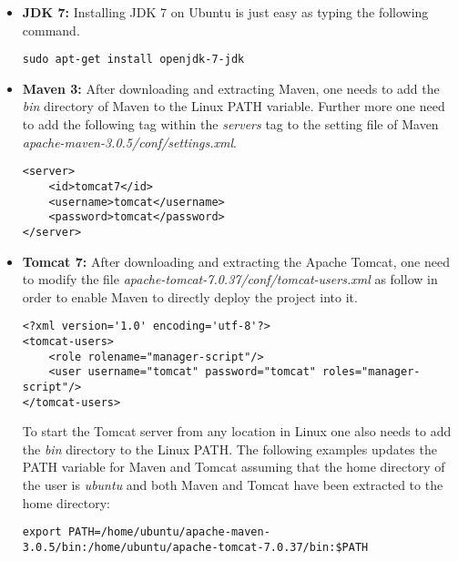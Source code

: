 \begin{itemize}
\item{\textbf{\ac{JDK} 7:}} Installing  \ac{JDK} 7 on Ubuntu is just easy as typing the following command.%
\begin{code}
\begin{verbatim}
sudo apt-get install openjdk-7-jdk
\end{verbatim}
\end{code}

\item{\textbf{Maven 3:}}  After downloading and extracting Maven, one needs to add the \textit{bin} directory of Maven to the Linux PATH variable. Further more one need to add the following tag within the \textit{servers} tag to the setting file of Maven \textit{apache-maven-3.0.5/conf/settings.xml}.
\begin{code}
\begin{verbatim}
<server>
	<id>tomcat7</id>
	<username>tomcat</username>
	<password>tomcat</password>
</server>
\end{verbatim}
\end{code}

\item{\textbf{Tomcat 7:}} After downloading and extracting the Apache Tomcat, one need to modify the file \textit{apache-tomcat-7.0.37/conf/tomcat-users.xml} as follow in order to enable Maven to directly deploy the project into it. 
\begin{code}
\begin{verbatim}
<?xml version='1.0' encoding='utf-8'?>
<tomcat-users>
	<role rolename="manager-script"/>
	<user username="tomcat" password="tomcat" roles="manager-script"/>
</tomcat-users>
\end{verbatim}
\end{code}

To start the Tomcat server from any location in Linux one also needs to add the \textit{bin} directory to the Linux PATH. The following examples updates the PATH variable for Maven and Tomcat assuming that the home directory of the user is \textit{ubuntu} and both Maven and Tomcat have been extracted to the home directory:
\begin{code}
\begin{verbatim}
export PATH=/home/ubuntu/apache-maven-3.0.5/bin:/home/ubuntu/apache-tomcat-7.0.37/bin:$PATH
\end{verbatim}
\end{code}


\end{itemize}
